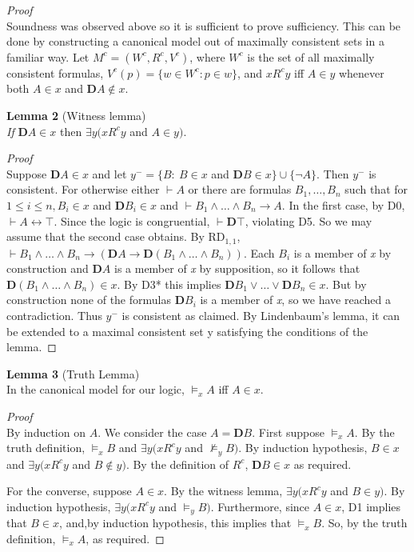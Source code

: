 \documentclass[
  11pt,
  letterpaper,
  DIV=11,
  numbers=noendperiod,
  twoside]{scrartcl}
\begin{document}
\emph{Proof}\\
Soundness was observed above so it is sufficient to prove sufficiency.
This can be done by constructing a canonical model out of maximally
consistent sets in a familiar way. Let \(M^c=(W^c\!, R^c\!,V^c)\), where
\(W^c\) is the set of all maximally consistent formulas,
\(V^c(p)=\{w{\in}W^c\!: p{\in}w\}\), and \(xR^cy\) iff \(A{\in}y\)
whenever both \(A{\in}x\) and \(\mathbf{D}A{\notin}x\).

\textbf{Lemma 2} (Witness lemma)\\
\emph{If} \(\mathbf{D}A{\in}x\) then \(\exists y (xR^cy\) and
\(A{\in}y)\).

\emph{Proof}\\
Suppose \(\mathbf{D}A {\in}x\) and let \(y^- = \{B{:}~ B{\in}x\) and
\(\mathbf{D}B{\in}x\}\cup\{\neg A\}\). Then \(y^-\) is consistent. For
otherwise either \(\vdash A\) or there are formulas \(B_1,{\ldots},B_n\)
such that for \(1\le i\le n, B_i{\in}x\) and \(\mathbf{D}B_i{\in}x\) and
\(\vdash B_1\wedge {\ldots}\wedge B_n\rightarrow A\). In the first case,
by D0, \(\vdash A{\leftrightarrow}\top\). Since the logic is
congruential, \(\vdash \mathbf{D}\top\), violating D5. So we may assume
that the second case obtains. By RD\(_{1,1}\),
\(\vdash B_1\wedge {\ldots}\wedge B_n\rightarrow (\mathbf{D}A\rightarrow \mathbf{D}(B_1\wedge {\ldots}\wedge B_n))\).
Each \(B_i\) is a member of \emph{x} by construction and \(\mathbf{D}A\)
is a member of \emph{x} by supposition, so it follows that
\(\mathbf{D}(B_1\wedge {\ldots}\wedge B_n){\in}x\). By D3* this implies
\(\mathbf{D}B_1\vee {\ldots}\vee \mathbf{D}B_n \in x\). But by
construction none of the formulas \(\mathbf{D}B_i\) is a member of
\emph{x}, so we have reached a contradiction. Thus \(y^-\) is consistent
as claimed. By Lindenbaum's lemma, it can be extended to a maximal
consistent set y satisfying the conditions of the lemma.~◻

\textbf{Lemma 3} (Truth Lemma)\\
In the canonical model for our logic, \(\models _x A\) iff \(A{\in}x\).

\emph{Proof}\\
By induction on \(A\). We consider the case \(A=\mathbf{D}B\). First
suppose \(\models _x A\). By the truth definition, \(\models _x B\) and
\(\exists y (xR^cy\) and \({\nvDash_y}B)\). By induction hypothesis,
\(B{\in}x\) and \(\exists y (xR^cy\) and \(B{\notin}y)\). By the
definition of \(R^c\), \(\mathbf{D}B{\in}x\) as required.

For the converse, suppose \(A{\in}x\). By the witness lemma,
\(\exists y (xR^cy\) and \(B{\in}y)\). By induction hypothesis,
\(\exists y( xR^cy\) and \({\models_y}B)\). Furthermore, since
\(A{\in}x\), D1 implies that \(B{\in}x\), and,by induction hypothesis,
this implies that \(\models _x B\). So, by the truth definition,
\(\models _x A\), as required.~◻
\end{document}
